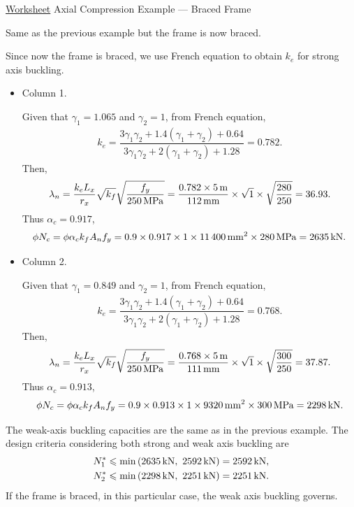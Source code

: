 \begin{exmp}\href{run:./WORKSHEET/CH04/EX4.ACSF.sm}{Worksheet}
Axial Compression Example --- Braced Frame

Same as the previous example but the frame is now braced.
\begin{figure}[H]

\end{figure}
\end{exmp}
\begin{solution}
Since now the frame is braced, we use French equation to obtain $k_e$ for strong axis buckling.
\begin{itemize}
\item Column 1.

Given that $\gamma_1=1.065$ and $\gamma_2=1$, from French equation,
\begin{gather*}
k_e=\dfrac{3\gamma_1\gamma_2+1.4\left(\gamma_1+\gamma_2\right)+0.64}{3\gamma_1\gamma_2+2\left(\gamma_1+\gamma_2\right)+1.28}=0.782.
\end{gather*}
Then,
\begin{gather*}
\lambda_n=\dfrac{k_eL_x}{r_x}\sqrt{k_f}\sqrt{\dfrac{f_y}{\SI{250}{\mega\pascal}}}=\dfrac{0.782\times\SI{5}{\meter}}{\SI{112}{\milli\meter}}\times\sqrt{1}\times\sqrt{\dfrac{280}{250}}=36.93.
\end{gather*}
Thus $\alpha_c=0.917$,
\begin{gather*}
\phi{}N_c=\phi\alpha_ck_fA_nf_y=0.9\times0.917\times1\times\SI{11400}{\milli\meter^2}\times\SI{280}{\mega\pascal}=\SI{2635}{\kilo\newton}.
\end{gather*}
\item Column 2.

Given that $\gamma_1=0.849$ and $\gamma_2=1$, from French equation,
\begin{gather*}
k_e=\dfrac{3\gamma_1\gamma_2+1.4\left(\gamma_1+\gamma_2\right)+0.64}{3\gamma_1\gamma_2+2\left(\gamma_1+\gamma_2\right)+1.28}=0.768.
\end{gather*}
Then,
\begin{gather*}
\lambda_n=\dfrac{k_eL_x}{r_x}\sqrt{k_f}\sqrt{\dfrac{f_y}{\SI{250}{\mega\pascal}}}=\dfrac{0.768\times\SI{5}{\meter}}{\SI{111}{\milli\meter}}\times\sqrt{1}\times\sqrt{\dfrac{300}{250}}=37.87.
\end{gather*}
Thus $\alpha_c=0.913$,
\begin{gather*}
\phi{}N_c=\phi\alpha_ck_fA_nf_y=0.9\times0.913\times1\times\SI{9320}{\milli\meter^2}\times\SI{300}{\mega\pascal}=\SI{2298}{\kilo\newton}.
\end{gather*}
\end{itemize}

The weak-axis buckling capacities are the same as in the previous example. The design criteria considering both strong and weak axis buckling are
\begin{gather*}
N^*_1\leqslant\min\left(\SI{2635}{\kilo\newton},~\SI{2592}{\kilo\newton}\right)=\SI{2592}{\kilo\newton},\\
N^*_2\leqslant\min\left(\SI{2298}{\kilo\newton},~\SI{2251}{\kilo\newton}\right)=\SI{2251}{\kilo\newton}.
\end{gather*}
If the frame is braced, in this particular case, the weak axis buckling governs.
\end{solution}

